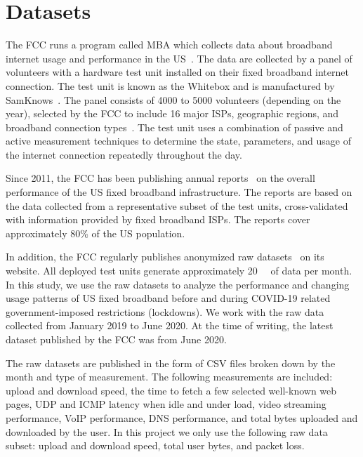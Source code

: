 \documentclass[conference,10pt]{IEEEtran}
\begin{document}
\section{Datasets}\label{sec:datasets}

The \gls{FCC} runs a program called \gls{MBA} which collects data about broadband internet usage and performance in the \gls{US}~\cite{mba}. The data are collected by a panel of volunteers with a hardware test unit installed on their fixed broadband internet connection. The test unit is known as the Whitebox and is manufactured by SamKnows~\cite{sam}. The panel consists of 4000 to 5000 volunteers (depending on the year), selected by the \gls{FCC} to include 16 major \glspl{ISP}, geographic regions, and broadband connection types~\cite{fcc-report-appendix}. The test unit uses a combination of passive and active measurement techniques to determine the state, parameters, and usage of the internet connection repeatedly throughout the day.

Since 2011, the \gls{FCC} has been publishing annual reports~\cite{mba-studies} on the overall performance of the \gls{US} fixed broadband infrastructure. The reports are based on the data collected from a representative subset of the test units, cross-validated with information provided by fixed broadband \glspl{ISP}. The reports cover approximately 80\% of the \gls{US} population.

In addition, the \gls{FCC} regularly publishes anonymized raw datasets~\cite{data} on its website. All deployed test units generate approximately \SI{20}{\giga\byte} of data per month. In this study, we use the raw datasets to analyze the performance and changing usage patterns of \gls{US} fixed broadband before and during COVID-19 related government-imposed restrictions (lockdowns). We work with the raw data collected from January 2019 to June 2020. At the time of writing, the latest dataset published by the \gls{FCC} was from June 2020.

The raw datasets are published in the form of \gls{CSV} files broken down by the month and type of measurement. The following measurements are included: upload and download speed, the time to fetch a few selected well-known web pages, \gls{UDP} and \gls{ICMP} latency when idle and under load, video streaming performance, \gls{VoIP} performance, \gls{DNS} performance, and total bytes uploaded and downloaded by the user. In this project we only use the following raw data subset: upload and download speed, total user bytes, and packet loss.
\end{document}
